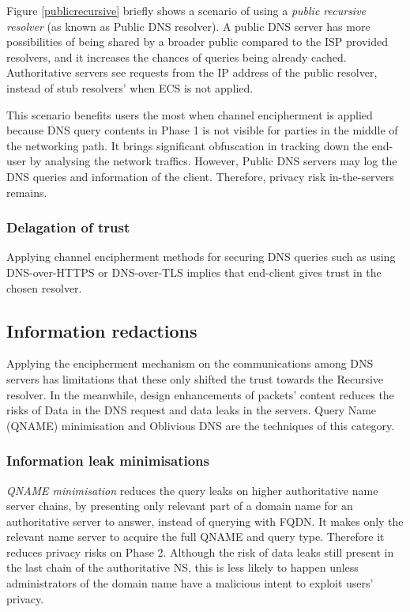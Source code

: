 Figure \ref{publicrecursive} briefly shows a scenario of using a \textit{public recursive resolver} (as known as Public DNS resolver).
A public DNS server has more possibilities of being shared by a broader public compared to the ISP provided resolvers, and it increases the chances of queries being already cached. Authoritative servers see requests from the IP address of the public resolver, instead of stub resolvers' when ECS is not applied.

This scenario benefits users the most when channel encipherment is applied because DNS query contents in Phase 1 is not visible for parties in the middle of the networking path. It brings significant obfuscation in tracking down the end-user by analysing the network traffics. However, Public DNS servers may log the DNS queries and information of the client. Therefore, privacy risk in-the-servers remains.

\subsubsection{Delagation of trust}
Applying channel encipherment methods for securing DNS queries such as using DNS-over-HTTPS or DNS-over-TLS implies that end-client gives trust in the chosen resolver.

\FloatBarrier
\subsection{Information redactions}
Applying the encipherment mechanism on the communications among DNS servers has limitations that these only shifted the trust towards the Recursive resolver.
In the meanwhile, design enhancements of packets' content reduces the risks of Data in the DNS request and data leaks in the servers.
Query Name (QNAME) minimisation \cite{bortzmeyer2016dns} and Oblivious DNS \cite{annee-dprive-oblivious-dns-00} are the techniques of this category.

\subsubsection{Information leak minimisations}
\textit{QNAME minimisation} reduces the query leaks on higher authoritative name server chains, by presenting only relevant part of a domain name for an authoritative server to answer, instead of querying with FQDN.
It makes only the relevant name server to acquire the full QNAME and query type. Therefore it reduces privacy risks on Phase 2.
Although the risk of data leaks still present in the last chain of the authoritative NS, this is less likely to happen unless administrators of the domain name have a malicious intent to exploit users' privacy.

